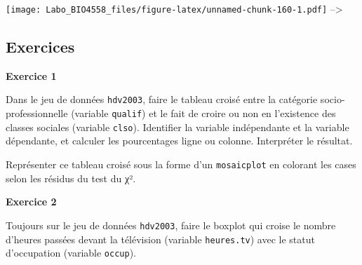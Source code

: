 \documentclass[12pt,]{book}
\newenvironment{Shaded}{\begin{snugshade}}{\end{snugshade}}
\newcommand{\CommentTok}[1]{\textcolor[rgb]{0.37,0.37,0.37}{\textit{#1}}}
\newcommand{\DataTypeTok}[1]{\textcolor[rgb]{0.27,0.27,0.27}{#1}}
\newcommand{\KeywordTok}[1]{\textcolor[rgb]{0.27,0.27,0.27}{\textbf{#1}}}
\newcommand{\NormalTok}[1]{#1}
\newcommand{\OperatorTok}[1]{\textcolor[rgb]{0.43,0.43,0.43}{\textbf{#1}}}
\newcommand{\OtherTok}[1]{\textcolor[rgb]{0.37,0.37,0.37}{#1}}
\newcommand{\StringTok}[1]{\textcolor[rgb]{0.5,0.5,0.5}{#1}}
\begin{document}
\texttt{[image: Labo\_BIO4558\_files/figure-latex/unnamed-chunk-160-1.pdf]}
--\textgreater{}

\hypertarget{ex-introR-biv}{%
\subsection{Exercices}\label{ex-introR-biv}}

\textbf{Exercice 1}

Dans le jeu de données \texttt{hdv2003}, faire le tableau croisé entre la catégorie socio-professionnelle (variable \texttt{qualif}) et le fait de croire ou non en l'existence des classes sociales (variable \texttt{clso}). Identifier la variable indépendante et la variable dépendante, et calculer les pourcentages ligne ou colonne. Interpréter le résultat.

Représenter ce tableau croisé sous la forme d'un \texttt{mosaicplot} en colorant les cases selon les résidus du test du χ².

\textbf{Exercice 2}

Toujours sur le jeu de données \texttt{hdv2003}, faire le boxplot qui croise le nombre d'heures passées devant la télévision (variable \texttt{heures.tv}) avec le statut d'occupation (variable \texttt{occup}).

\iffalse
\end{document}
